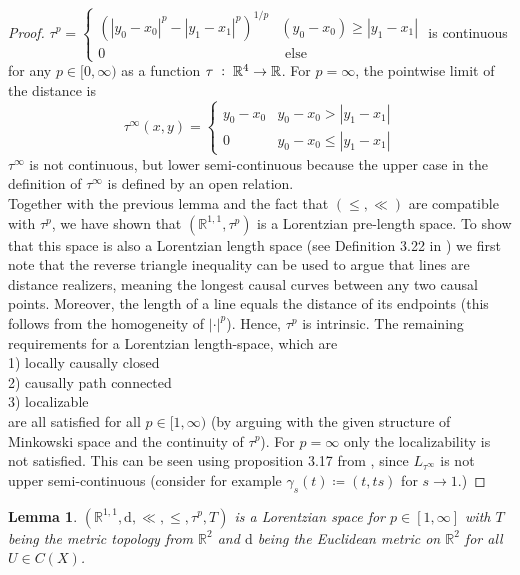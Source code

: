 \documentclass[11pt, a4paper]{article} %
\newcommand{\R}{\mathbb{R}} %
\newcommand{\dd}{\text{d}} %
\newtheorem{lemma}[definition]{Lemma}
\theoremstyle{plain} %
\newcommand{\mDef}{\coloneqq }
\newcommand{\pp}{\; \vcentcolon \;}
\begin{document}
\begin{proof}
$\tau^p =\begin{cases}
\left( |y_0 - x_0|^p - |y_1 - x_1| ^p \right)^{1/p} & (y_0 - x_0) \geq |y_1 - x_1| \\
    0 & \text{ else }
        \end{cases} $
    is continuous for any $p\in[0,\infty)$ as a function $\tau\pp \R^4\to\R$. For $p=\infty$, the pointwise limit of the distance is
    \begin{equation*}
        \tau^\infty (x,y) = \begin{cases}
        y_0 - x_0 & y_0 - x_0 > |y_1 - x_1|\\
        0 & y_0 - x_0 \leq |y_1 - x_1|
        \end{cases}
        \end{equation*}
    $\tau^\infty$ is not continuous, but lower semi-continuous because the upper case in the definition of $\tau^\infty$ is defined by an open relation.\\
    Together with the previous lemma and the fact that $(\leq,\ll)$ are compatible with $\tau^p$, we have shown that $(\R^{1,1},\tau^p)$ is a Lorentzian pre-length space. To show that this space is also a Lorentzian length space (see Definition 3.22 in \cite{kunzinger2018lorentz}) we first note that the reverse triangle inequality can be used to argue that lines are distance realizers, meaning the longest causal curves between any two causal points. Moreover, the length of a line equals the distance of its endpoints (this follows from the homogeneity of $|\cdot|^p$). Hence, $\tau^p$ is intrinsic.
The remaining requirements for a Lorentzian length-space, which are\\
    \null\hspace{1cm} 1) locally causally closed\\
    \null\hspace{1cm} 2) causally path connected\\
    \null\hspace{1cm} 3) localizable\\
    are all satisfied for all $p\in [1,\infty)$ (by arguing with the given structure of Minkowski space and the continuity of $\tau^p$). For $p=\infty$ only the localizability is not satisfied. This can be seen using proposition 3.17 from \cite{kunzinger2018lorentz}, since $L_{\tau^\infty}$ is not upper semi-continuous (consider for example $\gamma_s(t)\mDef (t, ts)$ for $s\to 1$.)
\end{proof}
\begin{lemma}
    $(\R^{1,1},\dd,\ll,\leq,\tau^p,T)$ is a Lorentzian space for $p\in[1,\infty]$ with $T$ being the metric topology from $\R^2$ and $\dd$ being the Euclidean metric on $\R^2$ for all $U\in C(X)$.
\end{lemma}
\end{document}
